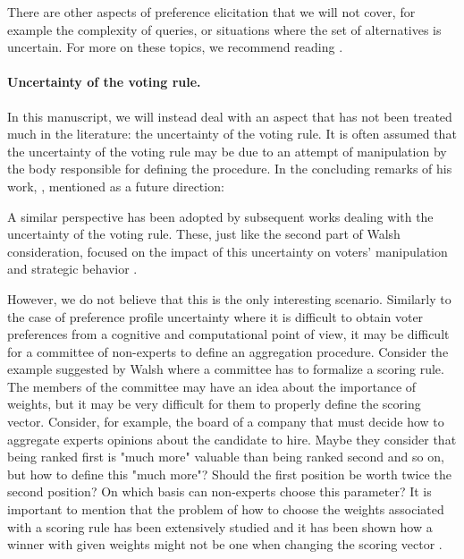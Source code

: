 There are other aspects of preference elicitation that we will not cover, for example the complexity of queries, or situations where the set of alternatives is uncertain. For more on these topics, we recommend reading \citet[Ch. 10]{Comsoc2016}.
\paragraph{Uncertainty of the voting rule.}
In this manuscript, we will instead deal with an aspect that has not been treated much in the literature: the uncertainty of the voting rule. It is often assumed that the uncertainty of the voting rule may be due to an attempt of manipulation by the body responsible for defining the procedure. In the concluding remarks of his work, \citet{Walsh2007}, mentioned as a future direction:

\textit{}

A similar perspective has been adopted by subsequent works dealing with the uncertainty of the voting rule. These, just like the second part of Walsh consideration, focused on the impact of this uncertainty on voters' manipulation and strategic behavior \citep{Baumeister2011,Elkind2012,Holliday2019}.

However, we do not believe that this is the only interesting scenario. Similarly to the case of preference profile uncertainty where it is difficult to obtain voter preferences from a cognitive and computational point of view, it may be difficult for a committee of non-experts to define an aggregation procedure. 
Consider the example suggested by Walsh where a committee has to formalize a scoring rule. The members of the committee may have an idea about the importance of weights, but it may be very difficult for them to properly define the scoring vector. 
Consider, for example, the board of a company that must decide how to aggregate experts opinions about the candidate to hire. Maybe they consider that being ranked first is "much more" valuable than being ranked second and so on, but how to define this "much more"? Should the first position be worth twice the second position? On which basis can non-experts choose this parameter?
It is important to mention that the problem of how to choose the weights associated with a scoring rule has been extensively studied and it has been shown how a winner with given weights might not be one when changing the scoring vector \citep{Cook1990,Llamazares2013,Llamazares2016}. 

